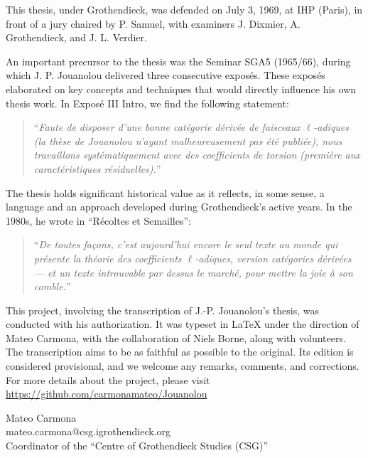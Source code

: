 \documentclass[12pt,twoside]{report} %
\theoremstyle{plain}
\theoremstyle{definition}
\begin{document}
This thesis, under Grothendieck, was defended on July 3, 1969, at IHP (Paris), in front of a jury chaired by P. Samuel, with examiners J. Dixmier, A. Grothendieck, and J. L. Verdier. 

An important precursor to the thesis was the Seminar SGA5 (1965/66), during which J. P. Jouanolou delivered three consecutive exposés. These exposés elaborated on key concepts and techniques that would directly influence his own thesis work. In Exposé III Intro, we find the following statement:
\begin{quote}
    ``\emph{Faute de disposer d'une bonne catégorie dérivée de faisceaux $\ell$-adiques (la thèse de Jouanolou n'ayant malheureusement pas été publiée), nous travaillons systématiquement avec des coefficients de torsion (première aux caractéristiques résiduelles).}''
\end{quote}
The thesis holds significant historical value as it reflects, in some sense, a language and an approach developed during Grothendieck's active years. In the 1980s, he wrote in ``Récoltes et Semailles'':
\begin{quote}
    ``\emph{De toutes façons, c'est aujourd'hui encore le seul texte au monde qui présente la théorie des coefficients $\ell$-adiques, version catégories dérivées --- et un texte introuvable par dessus le marché, pour mettre la joie à son comble.}''
\end{quote}
This project, involving the transcription of J.-P. Jouanolou's thesis, was conducted with his authorization. It was typeset in \LaTeX{} under the direction of Mateo Carmona, with the collaboration of Niels Borne, along with volunteers. The transcription aims to be as faithful as possible to the original. Its edition is considered provisional, and we welcome any remarks, comments, and corrections. For more details about the project, please visit \\
\url{https://github.com/carmonamateo/Jouanolou}

\begin{flushright}
Mateo Carmona \\ 
mateo.carmona@csg.igrothendieck.org \\
Coordinator of the ``Centre of Grothendieck Studies (CSG)''
\end{flushright}




\renewcommand{\contentsname}{TABLE DE MATIÈRES}
\tableofcontents\thispagestyle{empty}
\end{document}
